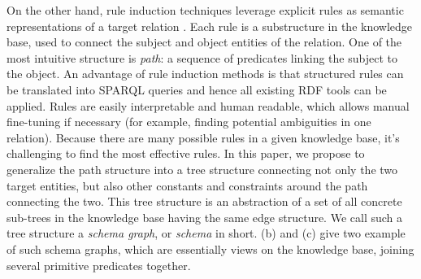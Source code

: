 On the other hand, rule induction techniques leverage explicit rules
as semantic representations of a target relation
\cite{lao2010relational,lao2011random,gardner2015efficient}.
Each rule is a substructure in the knowledge base, used to
connect the subject and object entities of the relation.
One of the most intuitive structure is {\em path}: a sequence of predicates
linking the subject to the object.
An advantage of rule induction methods is that structured 
rules can be translated into SPARQL queries and 
hence all existing RDF tools can be applied.
Rules are easily interpretable and human readable, 
which allows manual fine-tuning
if necessary (for example, finding potential ambiguities in one relation).
Because there are many possible rules in a given knowledge base,
it's challenging to find the most effective rules.
In this paper, we propose to generalize the path structure
into a tree structure connecting not only the two target entities, but also
other constants and constraints around the path connecting the two. 
This tree structure is an abstraction of a set of all 
concrete sub-trees in the knowledge base having the same edge
structure.
We call such a tree structure a {\em schema graph}, or {\em schema}
in short.  (b) and (c) give two example of
such schema graphs, which are essentially views 
on the knowledge base, joining several primitive predicates together.

